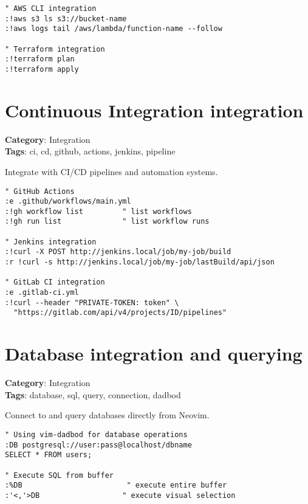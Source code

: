 {{{{{{\begin{Exa*}{}
\begin{Verbatim}[fontsize=\footnotesize, breaklines, breakanywhere]
" AWS CLI integration
:!aws s3 ls s3://bucket-name
:!aws logs tail /aws/lambda/function-name --follow

" Terraform integration
:!terraform plan
:!terraform apply
\end{Verbatim}
\end{Exa*}

\section{Continuous Integration integration}

\textbf{Category}: Integration\\ \textbf{Tags}: ci, cd, github, actions, jenkins, pipeline
\vspace{0.5cm}

Integrate with CI/CD pipelines and automation systems.

\begin{Exa*}{}
\begin{Verbatim}[fontsize=\footnotesize, breaklines, breakanywhere]
" GitHub Actions
:e .github/workflows/main.yml
:!gh workflow list         " list workflows
:!gh run list              " list workflow runs

" Jenkins integration
:!curl -X POST http://jenkins.local/job/my-job/build
:r !curl -s http://jenkins.local/job/my-job/lastBuild/api/json

" GitLab CI integration
:e .gitlab-ci.yml
:!curl --header "PRIVATE-TOKEN: token" \
  "https://gitlab.com/api/v4/projects/ID/pipelines"
\end{Verbatim}
\end{Exa*}

\section{Database integration and querying}

\textbf{Category}: Integration\\ \textbf{Tags}: database, sql, query, connection, dadbod
\vspace{0.5cm}

Connect to and query databases directly from Neovim.

\begin{Exa*}{}
\begin{Verbatim}[fontsize=\footnotesize, breaklines, breakanywhere]
" Using vim-dadbod for database operations
:DB postgresql://user:pass@localhost/dbname
SELECT * FROM users;

" Execute SQL from buffer
:%DB                        " execute entire buffer
:'<,'>DB                   " execute visual selection


\end{Verbatim}
\end{Exa*}}}}}}}
